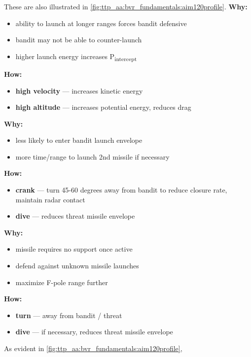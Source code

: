 \begin{tcoloritemize}
    These are also illustrated in \cref{fig:ttp_aa:bvr_fundamentals:aim120profile}.
    \textbf{Why:}
    \begin{itemize}
        \item ability to launch at longer ranges forces bandit defensive
        \item bandit may not be able to counter-launch
        \item higher launch energy increases P\textsubscript{intercept} %
    \end{itemize}
    \textbf{How:}
    \begin{itemize}
        \item \textbf{high velocity} --- increases kinetic energy 
        \item \textbf{high altitude} --- increases potential energy, reduces drag
    \end{itemize}
    \textbf{Why:}
    \begin{itemize}
        \item less likely to enter bandit launch envelope
        \item more time/range to launch 2nd missile if necessary
    \end{itemize}
    \textbf{How:}
    \begin{itemize}
        \item \textbf{crank} --- turn 45-60 degrees away from bandit to reduce closure rate, maintain radar contact
        \item \textbf{dive} --- reduces threat missile envelope
    \end{itemize}
    \textbf{Why:}
    \begin{itemize}
        \item missile requires no support once active
        \item defend against unknown missile launches
        \item maximize F-pole range further
    \end{itemize}
    \textbf{How:}
    \begin{itemize}
        \item \textbf{turn} --- away from bandit / threat
        \item \textbf{dive} --- if necessary, reduces threat missile envelope 
    \end{itemize}
    As evident in \cref{fig:ttp_aa:bvr_fundamentals:aim120profile}, 

\end{tcoloritemize}
